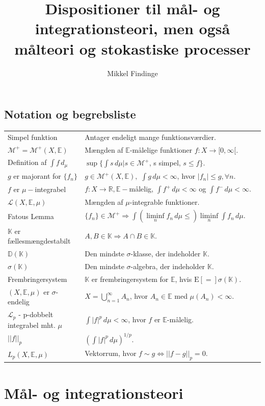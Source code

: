\documentclass[12pt]{report}
\title{Dispositioner til mål- og integrationsteori, men også målteori og stokastiske processer}
\author{Mikkel Findinge}
\theoremstyle{break}
\theoremstyle{break}
\newcommand{\E}[1]{\mathrm{E}\left[#1\right]}
\newcommand{\Int}[1]{\int#1\,d\mu}
\newcommand{\RR}{\mathbb{R}}
\newcommand{\EE}{\mathbb{E}}
\newcommand{\M}{\mathcal{M}^+}
\renewcommand{\L}{\mathcal{L}}
\newcommand{\K}{\mathbb{K}}
\newcommand{\D}{\mathbb{D}}
\newcommand{\laengde}[1]{\lvert|#1\rvert|}
\newcommand{\1}{\mathds{1}}
\begin{document}
\maketitle
{}

\section*{Notation og begrebsliste}
\renewcommand{\arraystretch}{3}
\begin{tabular}{p{0.3\linewidth}p{0.7\linewidth}}
Simpel funktion & Antager endeligt mange funktionsværdier.
\\
$\M=\M(X,\EE)$ & Mængden af $\EE$-målelige funktioner $f\colon X\to[0,\infty[$.
\\
Definition af $\int f\, d_\mu$ & $\sup\{\int s\, d\mu| s\in\M$, s simpel, $s\leq f\}$.
\\
$g$ er majorant for $\{f_n\}$ & $g\in\M(X,\EE),$ $\int g\, d\mu<\infty$, hvor $\lvert f_n\rvert\leq g, \forall n$.
\\
$f$ er $\mu-$integrabel & $f\colon X\to\RR, \EE-$målelig, $\int f^+\, d\mu<\infty$ og $\int f^-\, d\mu<\infty$.
\\
$\L(X,\EE,\mu)$ & Mængden af $\mu$-integrable funktioner.
\\
Fatous Lemma & $\{f_n\}\in\M\Rightarrow\int\left(\liminf\limits_nf_n\, d\mu\leq\right)\liminf\limits_n\int f_n\, d\mu.$
\\
$\K$ er fællesmængdestabilt & $A,B\in\K\Rightarrow A\cap B\in\K$.
\\
$\D(\K)$ & Den mindste $\sigma$-klasse, der indeholder $\K$.
\\
$\sigma(\K)$ & Den mindste $\sigma$-algebra, der indeholder $\K$.
\\
Frembringersystem & $\K$ er frembringersystem for $\EE$, hvis $\E = \sigma(\K)$.
\\
$(X,\EE,\mu)$ er $\sigma$-endelig & $X = \bigcup_{n = 1}^\infty  {A_n}$, hvor $A_n\in\EE$ med $\mu(A_n)<\infty$.
\\
$\L_p$ - p-dobbelt integrabel mht. $\mu$ & $\Int{|f|^p}<\infty$, hvor $f$ er $\EE$-målelig.
\\
$\laengde{f}_p$ & $\left(\Int{|f|^p}\right)^{1/p}$.
\\
$L_p(X,\EE,\mu)$ & Vektorrum, hvor $f\sim g\Leftrightarrow\laengde{f-g}_p=0$.
\end{tabular}


\newpage
\chapter*{Mål- og integrationsteori}
\end{document}
